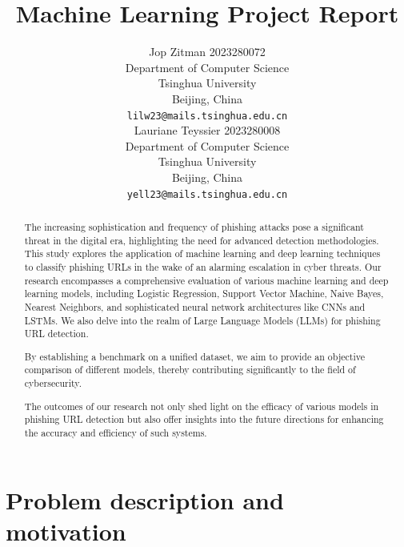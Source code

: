 \documentclass{article}
\title{Machine Learning Project Report}
\author{
    Jop Zitman 2023280072\\
    Department of Computer Science\\
    Tsinghua University\\
    Beijing, China \\
    \texttt{lilw23@mails.tsinghua.edu.cn} \\
    \And
    Lauriane Teyssier 2023280008\\
    Department of Computer Science\\
    Tsinghua University\\
    Beijing, China \\
    \texttt{yell23@mails.tsinghua.edu.cn} \\
}
\begin{document}
    \maketitle

    \begin{abstract}
        The increasing sophistication and frequency of phishing attacks pose a significant threat in the digital era, highlighting the need for advanced detection methodologies.
        This study explores the application of machine learning and deep learning techniques to classify phishing URLs in the wake of an alarming escalation in cyber threats.
        Our research encompasses a comprehensive evaluation of various machine learning and deep learning models, including Logistic Regression, Support Vector Machine, Naive Bayes, Nearest Neighbors, and sophisticated neural network architectures like CNNs and LSTMs. We also delve into the realm of Large Language Models (LLMs) for phishing URL detection.

        By establishing a benchmark on a unified dataset, we aim to provide an objective comparison of different models, thereby contributing significantly to the field of cybersecurity.

        The outcomes of our research not only shed light on the efficacy of various models in phishing URL detection but also offer insights into the future directions for enhancing the accuracy and efficiency of such systems.
    \end{abstract}

    \newpage
    \tableofcontents
    \newpage


%



    \section{Problem description and motivation}\label{sec:problem-description-and-motivation}
\end{document}
